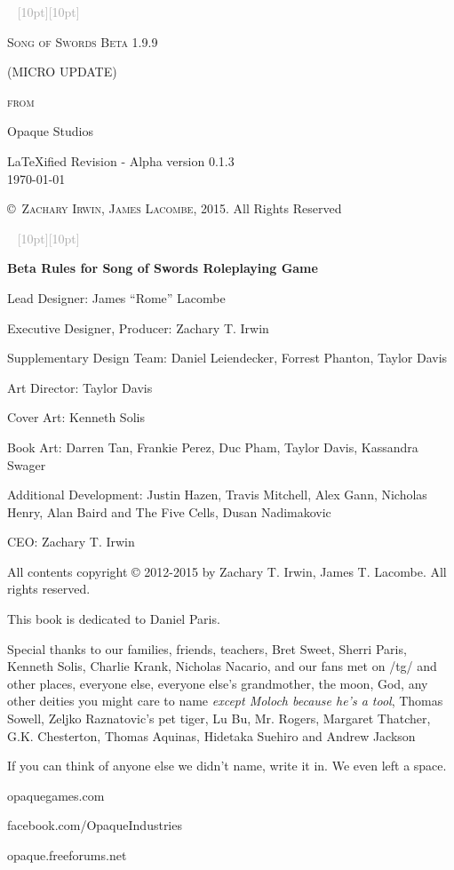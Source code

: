 \documentclass[oneside,11pt,english]{book}
\newcommand{\ornamento}{\vspace{2em}\noindent \textcolor{darkgray}{\hrulefill~ \raisebox{-2.5pt}[10pt][10pt]{\leafright \decofourleft \decothreeleft  \aldineright \decotwo \floweroneleft \decoone   \floweroneright \decotwo \aldineleft\decothreeright \decofourright \leafleft} ~  \hrulefill \linebreak \vspace{2em}}}
\begin{document}
\frontmatter

\begin{titlepage}
\pagestyle{empty}
	\centering
	\ornamento\\
	{\scshape\huge Song of Swords Beta 1.9.9\par}
	\vspace{0.8cm}
	{\scshape\Large{(MICRO UPDATE)}\par \scshape\Large{from} \par}
	\vspace{0.1 cm}
	{\huge Opaque Studios \par}
	\vfill
	{\Large\LaTeX ified Revision - Alpha version 0.1.3\\ \today }\par
	\vspace{0.2 cm}
	\textsc{\copyright~Zachary Irwin, James Lacombe}, 2015. All Rights Reserved
	
	\ornamento
\end{titlepage}
\newpage
\begin{center}
\vfill
\textbf{Beta Rules for Song of Swords Roleplaying Game}\par
Lead Designer: James “Rome” Lacombe\par
Executive Designer, Producer: Zachary T. Irwin\par
Supplementary Design Team: Daniel Leiendecker, Forrest Phanton, Taylor Davis\par
Art Director: Taylor Davis\par
Cover Art: Kenneth Solis\par
Book Art: Darren Tan, Frankie Perez, Duc Pham, Taylor Davis, Kassandra Swager\par


Additional Development: Justin Hazen, Travis Mitchell, Alex Gann, Nicholas Henry, Alan Baird and The Five Cells, Dusan Nadimakovic\par
CEO: Zachary T. Irwin\par


All contents copyright © 2012-2015 by Zachary T. Irwin, James T. Lacombe. All rights reserved.


This book is dedicated to Daniel Paris.
\vfill

Special thanks to our families, friends, teachers, Bret Sweet, Sherri Paris, Kenneth Solis, Charlie Krank, Nicholas Nacario, and our fans met on /tg/ and other places, everyone else, everyone else’s grandmother, the moon, God, any other deities you might care to name \textit{except Moloch because he’s a tool}, Thomas Sowell, Zeljko Raznatovic’s pet tiger, Lu Bu, Mr. Rogers, Margaret Thatcher, G.K. Chesterton, Thomas Aquinas, Hidetaka Suehiro and Andrew Jackson

\vspace{1cm}
If you can think of anyone else we didn’t name, write it in. We even left a space. 

\vfill
opaquegames.com

facebook.com/OpaqueIndustries

opaque.freeforums.net
\end{center}
\clearpage
{}
\tableofcontents %
\mainmatter
\end{document}
